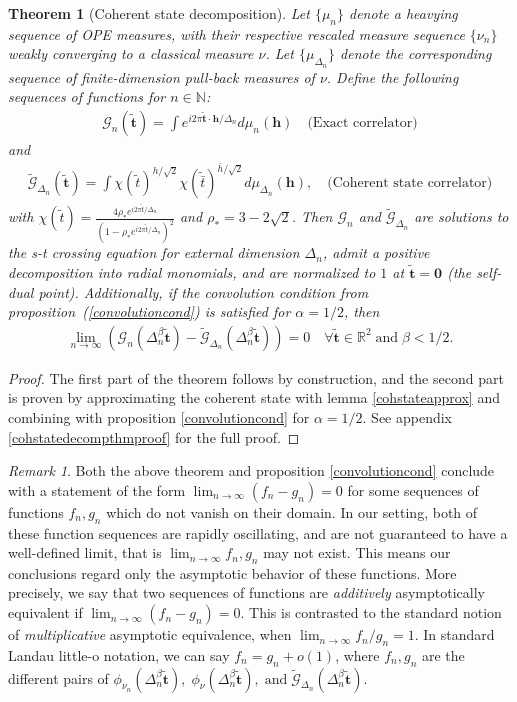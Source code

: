 \documentclass[a4paper,11pt]{article}
\theoremstyle{plain}
\newtheorem{thm}{Theorem}[section]
\theoremstyle{definition}
\theoremstyle{remark}
\newtheorem*{rem}{Remark}
\newcommand{\bs}[1]{\boldsymbol{#1}}
\newcommand{\ba}{\begin{equation} \begin{aligned}}
\newcommand{\ea}{\end{aligned} \end{equation}}
\newcommand{\De}{\Delta}
\begin{document}
\begin{thm}[Coherent state decomposition]
\label{cohstatedecompthm}
Let $\{\mu_n\}$ denote a heavying sequence of OPE measures, with their respective rescaled measure sequence $\{\nu_n\}$ weakly converging to a classical measure $\nu$.
Let $\{\mu_{\De_n}\}$ denote the corresponding sequence of finite-dimension pull-back measures of $\nu$. Define the following sequences of functions for $n \in \mathbb{N}$:
\ba
\mathcal{G}_n(\tilde{\bs{t}}) = \int  e^{i2\pi \tilde{\bs{t}}\cdot \bs{h} /\De_n} d\mu_n(\bs{h})\quad \text{(Exact correlator)}
\ea
and
\ba
\tilde{\mathcal{G}}_{\De_n}(\tilde{\bs{t}}) = \int \chi(\tilde{t})^{h/\sqrt{2}} \chi(\tilde{\bar{t}})^{\bar{h}/\sqrt{2}}d\mu_{\De_n} (\bs{h}) , \quad \text{(Coherent state correlator)}
\ea
with $\chi(\tilde{t}) = \frac{4 \rho_* e^{i2\pi \tilde{t}/\De_n}}{(1-\rho_* e^{i2\pi \tilde{t}/\De_n})^2}$ and $\rho_* = 3-2\sqrt{2}$. Then $\mathcal{G}_n$ and $\tilde{\mathcal{G}}_{\De_n}$ are solutions to the s-t crossing equation for external dimension $\De_n$, admit a positive decomposition into radial monomials, and are normalized to $1$ at $\tilde{\bs{t}} = \bs{0}$ (the self-dual point). Additionally, if the convolution condition from proposition~(\ref{convolutioncond}) is satisfied for $\alpha = 1/2$, then
\ba
\lim_{n \to \infty} \left( \mathcal{G}_n(\De_n^{\beta}\tilde{\bs{t}}) - \tilde{\mathcal{G}}_{\De_n}(\De_n^{\beta}\tilde{\bs{t}}) \right) = 0  \quad \forall\tilde{ \bs{t}} \in \mathbb{R}^2 \;\text{and} \; \beta < 1/2.
\label{cohstatevsexact}
\ea
\end{thm}
\begin{proof}
The first part of the theorem follows by construction, and the second part is proven by approximating the coherent state with lemma \ref{cohstateapprox} and combining with proposition \ref{convolutioncond} for $\alpha = 1/2$. See appendix \ref{cohstatedecompthmproof} for the full proof.
\end{proof}
\begin{rem}
    Both the above theorem and proposition \ref{convolutioncond} conclude with a statement of the form $\lim_{n\to\infty} ( f_n -g_n) = 0$ for some sequences of functions $f_n,g_n$ which do not vanish on their domain. In our setting, both of these function sequences are rapidly oscillating, and are not guaranteed to have a well-defined limit, that is $\lim_{n \to \infty } f_n,g_n $ may not exist. This means our conclusions regard only the asymptotic behavior of these functions. More precisely, we say that two sequences of functions are \textit{additively} asymptotically equivalent if $\lim_{n\to\infty}(f_n -g_n) =0$.  This is contrasted to the standard notion of \textit{multiplicative} asymptotic equivalence, when $\lim_{n\to\infty} f_n/g_n = 1$. In standard Landau little-o notation, we can say $ f_n = g_n +o(1)$, where $f_n,g_n$ are the different pairs of $\phi_{\nu_n}(\De_n^\beta \tilde{\bs{t}}),\;\phi_{\nu}(\De_n^{\beta}\tilde{\bs{t}}),\;\text{and}\;\tilde{\mathcal{G}}_{\De_n}(\De_n^\beta \tilde{\bs{t}})$.
\end{rem}
\end{document}
